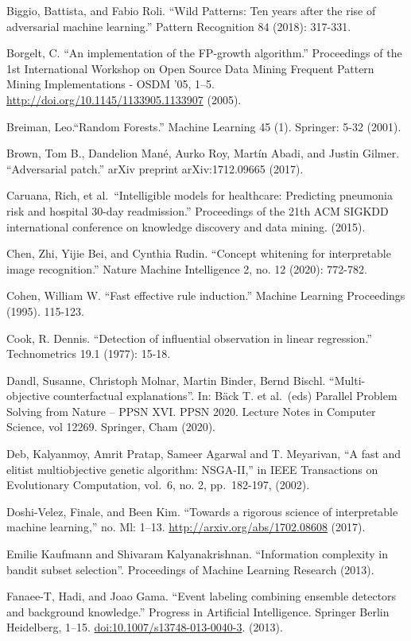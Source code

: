 \documentclass[
  10pt,
]{scrbook}
\begin{document}
Biggio, Battista, and Fabio Roli. ``Wild Patterns: Ten years after the rise of adversarial machine learning.'' Pattern Recognition 84 (2018): 317-331.

Borgelt, C. ``An implementation of the FP-growth algorithm.'' Proceedings of the 1st International Workshop on Open Source Data Mining Frequent Pattern Mining Implementations - OSDM '05, 1--5. \url{http://doi.org/10.1145/1133905.1133907} (2005).

Breiman, Leo.``Random Forests.'' Machine Learning 45 (1). Springer: 5-32 (2001).

Brown, Tom B., Dandelion Mané, Aurko Roy, Martín Abadi, and Justin Gilmer. ``Adversarial patch.'' arXiv preprint arXiv:1712.09665 (2017).

Caruana, Rich, et al.~``Intelligible models for healthcare: Predicting pneumonia risk and hospital 30-day readmission.'' Proceedings of the 21th ACM SIGKDD international conference on knowledge discovery and data mining. (2015).

Chen, Zhi, Yijie Bei, and Cynthia Rudin. ``Concept whitening for interpretable image recognition.'' Nature Machine Intelligence 2, no. 12 (2020): 772-782.

Cohen, William W. ``Fast effective rule induction.'' Machine Learning Proceedings (1995). 115-123.

Cook, R. Dennis. ``Detection of influential observation in linear regression.'' Technometrics 19.1 (1977): 15-18.

Dandl, Susanne, Christoph Molnar, Martin Binder, Bernd Bischl. ``Multi-objective counterfactual explanations''. In: Bäck T. et al.~(eds) Parallel Problem Solving from Nature -- PPSN XVI. PPSN 2020. Lecture Notes in Computer Science, vol 12269. Springer, Cham (2020).

Deb, Kalyanmoy, Amrit Pratap, Sameer Agarwal and T. Meyarivan, ``A fast and elitist multiobjective genetic algorithm: NSGA-II,'' in IEEE Transactions on Evolutionary Computation, vol.~6, no. 2, pp.~182-197, (2002).

Doshi-Velez, Finale, and Been Kim. ``Towards a rigorous science of interpretable machine learning,'' no. Ml: 1--13. \url{http://arxiv.org/abs/1702.08608} (2017).

Emilie Kaufmann and Shivaram Kalyanakrishnan. ``Information complexity in bandit subset selection''. Proceedings of Machine Learning Research (2013).

Fanaee-T, Hadi, and Joao Gama. ``Event labeling combining ensemble detectors and background knowledge.'' Progress in Artificial Intelligence. Springer Berlin Heidelberg, 1--15. \url{doi:10.1007/s13748-013-0040-3}. (2013).
\end{document}
